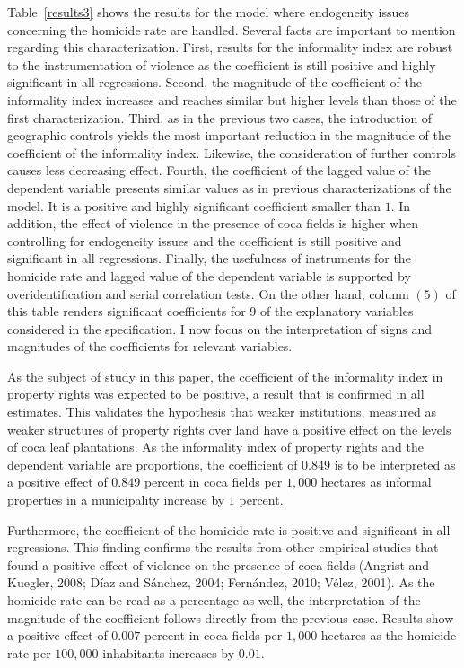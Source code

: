 \documentclass[a4paper, 12pt]{article}
\begin{document}
Table~\ref{results3} shows the results for the model where endogeneity issues concerning the homicide rate are handled. Several facts are important to mention regarding this characterization. First, results for the informality index are robust to the instrumentation of violence as the coefficient is still positive and highly significant in all regressions. Second, the magnitude of the coefficient of the informality index increases and reaches similar but higher levels than those of the first characterization. Third, as in the previous two cases, the introduction of geographic controls yields the most important reduction in the magnitude of the coefficient of the informality index. Likewise, the consideration of further controls causes less decreasing effect. Fourth, the coefficient of the lagged value of the dependent variable presents similar values as in previous characterizations of the model. It is a positive and highly significant coefficient smaller than $1$. In addition, the effect of violence in the presence of coca fields is higher when controlling for endogeneity issues and the coefficient is still positive and significant in all regressions. Finally, the usefulness of instruments for the homicide rate and lagged value of the dependent variable is supported by overidentification and serial correlation tests. On the other hand, column $(5)$ of this table renders significant coefficients for 9 of the explanatory variables considered in the specification. I now focus on the interpretation of signs and magnitudes of the coefficients for relevant variables.

As the subject of study in this paper, the coefficient of the informality index in property rights was expected to be positive, a result that is confirmed in all estimates. This validates the hypothesis that weaker institutions, measured as weaker structures of property rights over land have a positive effect on the levels of coca leaf plantations. As the informality index of property rights and the dependent variable are proportions, the coefficient of $0.849$ is to be interpreted as a positive effect of $0.849$ percent in coca fields per $1,000$ hectares as informal properties in a municipality increase by $1$ percent. 

Furthermore, the coefficient of the homicide rate is positive and significant in all regressions. This finding confirms the results from other empirical studies that found a positive effect of violence on the presence of coca fields (Angrist and Kuegler, 2008; D\'{i}az and S\'{a}nchez, 2004; Fern\'{a}ndez, 2010; V\'{e}lez, 2001). As the homicide rate can be read as a percentage as well, the interpretation of the magnitude of the coefficient follows directly from the previous case. Results show a positive effect of $0.007$ percent in coca fields per $1,000$ hectares as the homicide rate per $100,000$ inhabitants increases by $0.01$. 
\end{document}
